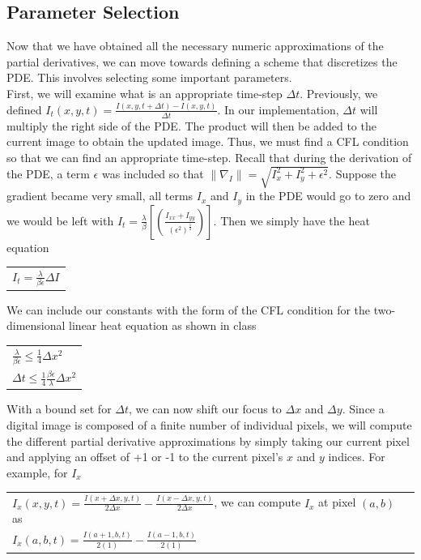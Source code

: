 \documentclass{article}
\begin{document}
  \newpage
  \subsection{Parameter Selection}
  \noindent
  Now that we have obtained all the necessary numeric approximations of the partial derivatives, we
  can move towards defining a scheme that discretizes the PDE. This involves selecting
  some important parameters.\\

  \noindent
  First, we will examine what is an appropriate time-step $\Delta t$. Previously,
  we defined $I_{t}(x,y,t) = \frac{I(x,y,t+\Delta t) - I(x,y,t)}{\Delta t}$. In our implementation,
  $\Delta t$ will multiply the right side of the PDE. The product will then be added to
  the current image to obtain the updated image. Thus, we must find a CFL condition
  so that we can find an appropriate time-step. Recall that during the derivation of
  the PDE, a term $\epsilon$ was included so that $\| \nabla_{I} \| = \sqrt{I_{x}^2 + I_{y}^2 + \epsilon^2}$.
  Suppose the gradient became very small, all terms $I_{x}$ and $I_{y}$ in the PDE would go to zero and 
  we would be left with $I_{t} = \frac{\lambda}{\beta}[(\frac{I_{xx}+I_{yy}}{(\epsilon^2)^\frac{1}{2}})]$.
  Then we simply have the heat equation
  \begin{center}
    \begin{tabular}{l}
      $I_{t} = \frac{\lambda}{\beta \epsilon}\Delta I$
    \end{tabular}
  \end{center}

  \noindent
  We can include our constants with the form of the CFL condition for the two-dimensional linear heat equation
  as shown in class
  \begin{center}
    \begin{tabular}{l}
      \vspace{12pt}
      $\frac{\lambda}{\beta \epsilon} \leq \frac{1}{4} \Delta x^2$\\
      $\Delta t \leq \frac{1}{4} \frac{\beta \epsilon}{\lambda} \Delta x^2$\\
    \end{tabular}
  \end{center}

  \noindent
  With a bound set for  $\Delta t$, we can now shift our focus to $\Delta x$ and $\Delta y$. Since
  a digital image is composed of a finite number of individual pixels, we will compute the different
  partial derivative approximations by simply taking our current pixel and applying an offset of
  +1 or -1 to the current pixel's $x$ and $y$ indices. For example, for $I_{x}$
  \begin{center}
    \begin{tabular}{l}
      $I_{x}(x,y,t) = \frac{I(x+\Delta x,y,t)}{2\Delta x} - \frac{I(x-\Delta x,y,t)}{2\Delta x}$, we can
      \vspace{12pt}
      compute $I_{x}$ at pixel $(a,b)$ as\\
      $I_{x}(a,b,t) = \frac{I(a+1,b,t)}{2(1)} - \frac{I(a-1,b,t)}{2(1)}$
    \end{tabular}
  \end{center}
\end{document}
